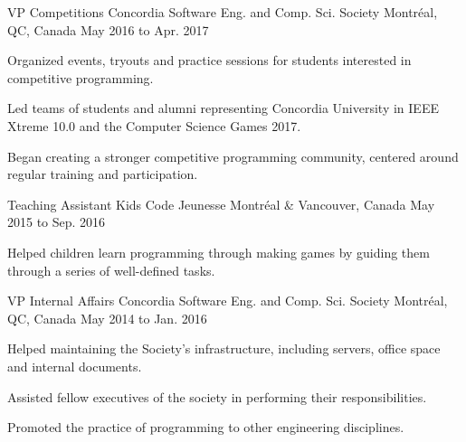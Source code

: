 \begin{cventries}
  \cventry
    {VP Competitions} %
    {Concordia Software Eng. and Comp. Sci. Society} %
    {Montréal, QC, Canada} %
    {May 2016 to Apr. 2017} %
    {
      \begin{cvitems} %
        \item {Organized events, tryouts and practice sessions for students interested in competitive programming.}
        \item {Led teams of students and alumni representing Concordia University in IEEE Xtreme 10.0 and the Computer Science Games 2017.}
        \item {Began creating a stronger competitive programming community, centered around regular training and participation.}
      \end{cvitems}
    }
    \vspace{2.0mm}
  \cventry
    {Teaching Assistant} %
    {Kids Code Jeunesse} %
    {Montréal \& Vancouver, Canada} %
    {May 2015 to Sep. 2016} %
    {
      \begin{cvitems} %
        \item {Helped children learn programming through making games by guiding them through a series of well-defined tasks.}
        \\
      \end{cvitems}
    }
    \vspace{2.0mm}

  \cventry
    {VP Internal Affairs} %
    {Concordia Software Eng. and Comp. Sci. Society} %
    {Montréal, QC, Canada} %
    {May 2014 to Jan. 2016} %
    {
      \begin{cvitems} %
        \item {Helped maintaining the Society’s infrastructure, including servers, office space and internal documents.}
        \item {Assisted fellow executives of the society in performing their responsibilities.}
        \item {Promoted the practice of programming to other engineering disciplines.}
      \end{cvitems}
    }
    \vspace{2.0mm}
    

\end{cventries}
